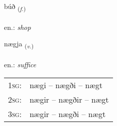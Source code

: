 \documentclass[frontgrid, backgrid]{flacards}\usepackage[]{graphicx}\usepackage[]{xcolor}
\begin{document}
{búð \small{\textsubscript{(\textit{f.})}} \\[1ex] %
\textphonetic{[puːð]} \\
en.: \emph{shop} \\  [2ex]
\renewcommand*{\arraystretch}{0.8}
}

\renewcommand{\flhead}{\vskip5pt \fboxsep=0pt {\small\bfseries\footnotesize Sagnorð | Verb}}
\renewcommand{\fcfoot}{\vskip5pt \fboxsep=0pt \hspace{2pt}{\small\bfseries\footnotesize 2K}}

\renewcommand{\blhead}{\vskip5pt {\small\bfseries\footnotesize Sagnorð | Verb }}
\renewcommand{\bcfoot}{\vskip5pt \hspace{2pt}{\small\bfseries\footnotesize 2K}}


{nægja \small{\textsubscript{(\textit{v.})}} \\[1ex] %
\textphonetic{[naiːja]} \\
en.: \emph{suffice} \\  [2ex]
\renewcommand*{\arraystretch}{0.8}
\begin{tabular}{p{1cm}l}
\textsc{1sg}: & nægi -- nægði -- nægt \\ 
\textsc{2sg}: & nægir -- nægðir -- nægt \\ 
\textsc{3sg}: & nægir -- nægði -- nægt \\ 
\end{tabular}
}

\renewcommand{\flhead}{\vskip5pt \fboxsep=0pt {\small\bfseries\footnotesize Nafnorð | Noun}}
\renewcommand{\fcfoot}{\vskip5pt \fboxsep=0pt \hspace{2pt}{\small\bfseries\footnotesize 2K}}

\renewcommand{\blhead}{\vskip5pt {\small\bfseries\footnotesize Nafnorð | Noun }}
\renewcommand{\bcfoot}{\vskip5pt \hspace{2pt}{\small\bfseries\footnotesize 2K}}
\end{document}
